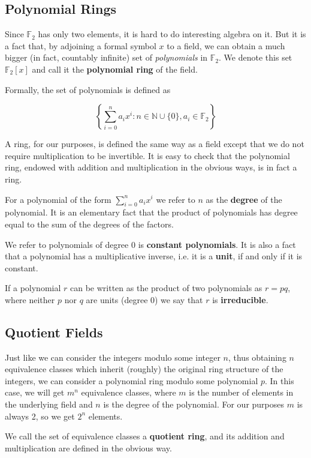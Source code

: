 \documentclass[letterpaper]{article}
\theoremstyle{xxx}
\theoremstyle{evil}
\theoremstyle{yyy}
\theoremstyle{plain}
\theoremstyle{zzz}
\newcommand{\ftwo}{\mathbb{F}_2}
\begin{document}
\subsection{Polynomial Rings}

Since $\ftwo$ has only two elements, it is hard to do interesting algebra on
it. But it is a fact that, by adjoining a formal symbol $x$ to a field, we
can obtain a much bigger (in fact, countably infinite) set of \emph{polynomials}
in $\ftwo$. We denote this set $\ftwo[x]$ and call it the \textbf{polynomial
ring} of the field.

Formally, the set of polynomials is defined as

\[ \left\{ \sum_{i=0}^n a_ix^i : n\in\mathbb{N}\cup\{0\}, a_i\in \ftwo  \right\} \]

A ring, for our purposes, is defined the same way as a field except that we do
not require multiplication to be invertible. It is easy to check that the
polynomial ring, endowed with addition and multiplication in the obvious ways,
is in fact a ring.

For a polynomial of the form $\sum_{i=0}^n a_ix^i$ we refer to $n$ as the
\textbf{degree} of the polynomial. It is an elementary fact that the product
of polynomials has degree equal to the sum of the degrees of the factors.

We refer to polynomials of degree 0 is \textbf{constant polynomials}. It is
also a fact that a polynomial has a multiplicative inverse, i.e. it is a
\textbf{unit}, if and only if it is constant.

If a polynomial $r$ can be written as the product of two polynomials as $r=pq$,
where neither $p$ nor $q$ are units (degree 0) we say that $r$ is
\textbf{irreducible}.

\subsection{Quotient Fields}

Just like we can consider the integers modulo some integer $n$, thus obtaining
$n$ equivalence classes which inherit (roughly) the original ring structure of
the integers, we can consider a polynomial ring modulo some polynomial $p$. In
this case, we will get $m^n$ equivalence classes, where $m$ is the number of
elements in the underlying field and $n$ is the degree of the polynomial. For
our purposes $m$ is always 2, so we get $2^n$ elements.

We call the set of equivalence classes a \textbf{quotient ring}, and its addition
and multiplication are defined in the obvious way.
\end{document}
